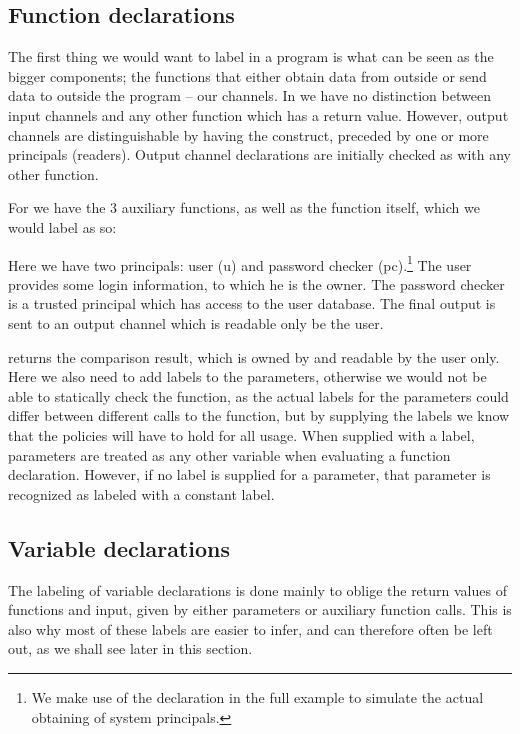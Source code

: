 \subsection{Function declarations}
The first thing we would want to label in a program is what can be seen as the bigger components; the functions that either obtain data from outside or send data to outside the program -- our channels.
In \thelang{} we have no distinction between input channels and any other function which has a return value.
However, output channels are distinguishable by having the \dlmc{<-} construct, preceded by one or more principals (readers).
Output channel declarations are initially checked as with any other function.

For  we have the 3 auxiliary functions, as well as the  function itself, which we would label as so:\\
\begin{minipage}{\linewidth}

\end{minipage}

Here we have two principals: user (u) and password checker (pc).\footnote{We make use of the  declaration in the full example to simulate the actual obtaining of system principals.}
The user provides some login information, to which he is the owner.
The password checker is a trusted principal which has access to the user database.
The final output is sent to an output channel which is readable only be the user.

 returns the comparison result, which is owned by and readable by the user only.
Here we also need to add labels to the parameters, otherwise we would not be able to statically check the function, as the actual labels for the parameters could differ between different calls to the function, but by supplying the labels we know that the policies will have to hold for all usage.
When supplied with a label, parameters are treated as any other variable when evaluating a function declaration.
However, if no label is supplied for a parameter, that parameter is recognized as labeled with a constant label.

\subsection{Variable declarations}
The labeling of variable declarations is done mainly to oblige the return values of functions and input, given by either parameters or auxiliary function calls.
This is also why most of these labels are easier to infer, and can therefore often be left out, as we shall see later in this section.

